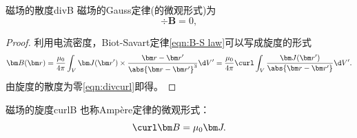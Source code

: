 
\begin{theorem}
    {磁场的散度}{divB}
    磁场的Gauss定律(的微观形式)为
    \begin{equation}
        \label{eqn:divB}
        \div\bm B=0,
    \end{equation}
\end{theorem}

\begin{proof}
    利用电流密度，Biot-Savart定律\eqref{eqn:B-S law}可以写成旋度的形式
    \begin{equation}
        \label{eqn:B(r)}
        \bm B(\bm r)=\frac{\mu_0}{4\pi}\int_V\bm J(\bm r')\times\frac{\bm r-\bm r'}{\abs{\bm r-\bm r'}^3}\d V'
        =\frac{\mu_0}{4\pi}\curl\int_V\frac{\bm J(\bm r')}{\abs{\bm r-\bm r'}}\d V'.
    \end{equation}
    由旋度的散度为零\eqref{eqn:divcurl}即得。
\end{proof}

\begin{theorem}
    {磁场的旋度}{curlB}
    也称Ampère定律的微观形式：
    \begin{equation}
        \label{eqn:curlB}
        \curl\bm B=\mu_0\bm J.
    \end{equation}
\end{theorem}

